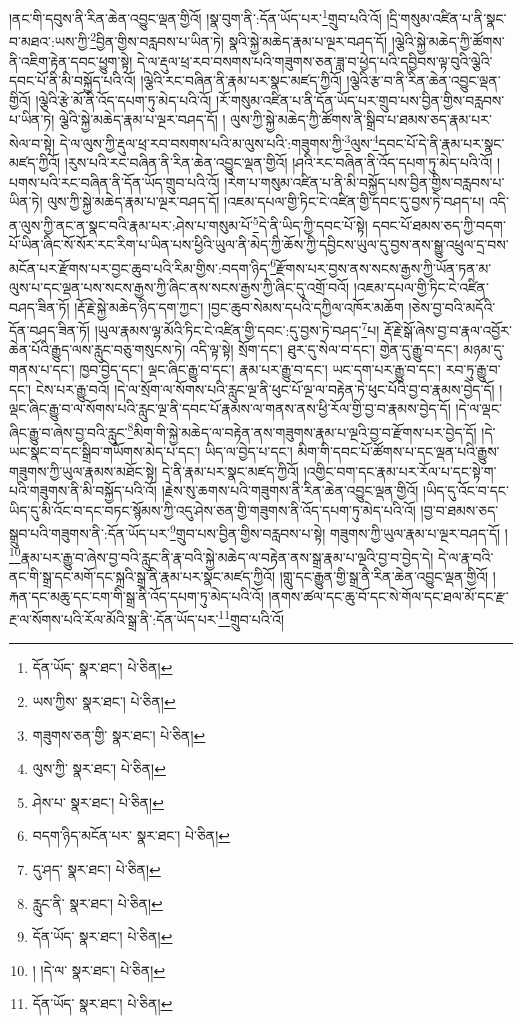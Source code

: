 །ནང་གི་དབུས་ནི་རིན་ཆེན་འབྱུང་ལྡན་གྱིའོ། །སྣ་བུག་ནི་:དོན་ཡོད་པར་\footnote{དོན་ཡོད་  སྣར་ཐང་།  པེ་ཅིན། }གྲུབ་པའི་འོ། །དྲི་གསུམ་འཛིན་པ་ནི་སྣང་བ་མཐའ་:ཡས་ཀྱི་\footnote{ཡས་ཀྱིས་  སྣར་ཐང་།  པེ་ཅིན། }བྱིན་གྱིས་བརླབས་པ་ཡིན་ཏེ། སྣའི་སྐྱེ་མཆེད་རྣམ་པ་ལྔར་བཤད་དོ། །ལྕེའི་སྐྱེ་མཆེད་ཀྱི་ཚོགས་ནི་འཇིག་རྟེན་དབང་ཕྱུག་སྟེ། དེ་ལ་རྡུལ་ཕྲ་རབ་བསགས་པའི་གཟུགས་ཅན་ཟླ་བ་ཕྱེད་པའི་དབྱིབས་ལྟ་བུའི་ལྕེའི་དབང་པོ་ནི་མི་བསྐྱོད་པའི་འོ། །ལྕེའི་རང་བཞིན་ནི་རྣམ་པར་སྣང་མཛད་ཀྱིའོ། །ལྕེའི་རྩ་བ་ནི་རིན་ཆེན་འབྱུང་ལྡན་གྱིའོ། །ལྕེའི་རྩེ་མོ་ནི་འོད་དཔག་ཏུ་མེད་པའི་འོ། །རོ་གསུམ་འཛིན་པ་ནི་དོན་ཡོད་པར་གྲུབ་པས་བྱིན་གྱིས་བརླབས་པ་ཡིན་ཏེ། ལྕེའི་སྐྱེ་མཆེད་རྣམ་པ་ལྔར་བཤད་དོ། །
ལུས་ཀྱི་སྐྱེ་མཆེད་ཀྱི་ཚོགས་ནི་སྒྲིབ་པ་ཐམས་ཅད་རྣམ་པར་སེལ་བ་སྟེ། དེ་ལ་ལུས་ཀྱི་རྡུལ་ཕྲ་རབ་བསགས་པའི་མ་ལུས་པའི་:གཟུགས་ཀྱི་\footnote{གཟུགས་ཅན་གྱི་  སྣར་ཐང་།  པེ་ཅིན། }ལུས་\footnote{ལུས་ཀྱི་  སྣར་ཐང་།  པེ་ཅིན། }དབང་པོ་དེ་ནི་རྣམ་པར་སྣང་མཛད་ཀྱིའོ། །རུས་པའི་རང་བཞིན་ནི་རིན་ཆེན་འབྱུང་ལྡན་གྱིའོ། །ཤའི་རང་བཞིན་ནི་འོད་དཔག་ཏུ་མེད་པའི་འོ། །པགས་པའི་རང་བཞིན་ནི་དོན་ཡོད་གྲུབ་པའི་འོ། །རེག་པ་གསུམ་འཛིན་པ་ནི་མི་བསྐྱོད་པས་བྱིན་གྱིས་བརླབས་པ་ཡིན་ཏེ། ལུས་ཀྱི་སྐྱེ་མཆེད་རྣམ་པ་ལྔར་བཤད་དོ། །འཇམ་དཔལ་གྱི་ཏིང་ངེ་འཛིན་གྱི་དབང་དུ་བྱས་ཏེ་བཤད་པ། འདི་ན་ལུས་ཀྱི་ནང་ན་སྣང་བའི་རྣམ་པར་:ཤེས་པ་གསུམ་པོ་\footnote{ཤེས་པ་  སྣར་ཐང་།  པེ་ཅིན། }དེ་ནི་ཡིད་ཀྱི་དབང་པོ་སྟེ། དབང་པོ་ཐམས་ཅད་ཀྱི་བདག་པོ་ཡིན་ཞིང་སོ་སོར་རང་རིག་པ་ཡིན་པས་ཕྱིའི་ཡུལ་ནི་མེད་ཀྱི་ཆོས་ཀྱི་དབྱིངས་ཡུལ་དུ་བྱས་ནས་སྒྱུ་འཕྲུལ་དྲ་བས་མངོན་པར་རྫོགས་པར་བྱང་ཆུབ་པའི་རིམ་གྱིས་:བདག་ཉིད་\footnote{བདག་ཉིད་མངོན་པར་  སྣར་ཐང་།  པེ་ཅིན། }རྫོགས་པར་བྱས་ནས་སངས་རྒྱས་ཀྱི་ཡོན་ཏན་མ་ལུས་པ་དང་ལྡན་པས་སངས་རྒྱས་ཀྱི་ཞིང་ནས་སངས་རྒྱས་ཀྱི་ཞིང་དུ་འགྲོ་བའོ། །འཇམ་དཔལ་གྱི་ཏིང་ངེ་འཛིན་བཤད་ཟིན་ཏོ། །རྡོ་རྗེ་སྐྱེ་མཆེད་ཉིད་དག་ཀྱང་། །བྱང་ཆུབ་སེམས་དཔའི་དཀྱིལ་འཁོར་མཆོག །ཅེས་བྱ་བའི་མདོའི་དོན་བཤད་ཟིན་ཏོ། །ཡུལ་རྣམས་ལྷ་མོའི་ཏིང་ངེ་འཛིན་གྱི་དབང་:དུ་བྱས་ཏེ་བཤད་\footnote{དུ་ཤད་  སྣར་ཐང་།  པེ་ཅིན། }པ། རྡོ་རྗེ་སྒོ་ཞེས་བྱ་བ་རྣལ་འབྱོར་ཆེན་པོའི་རྒྱུད་ལས་རླུང་བཅུ་གསུངས་ཏེ། འདི་ལྟ་སྟེ། སྲོག་དང་། ཐུར་དུ་སེལ་བ་དང་། གྱེན་དུ་རྒྱུ་བ་དང་། མཉམ་དུ་གནས་པ་དང་། ཁྱབ་བྱེད་དང་། ལྡང་ཞིང་རྒྱུ་བ་དང་། རྣམ་པར་རྒྱུ་བ་དང་། ཡང་དག་པར་རྒྱུ་བ་དང་། རབ་ཏུ་རྒྱུ་བ་དང་། ངེས་པར་རྒྱུ་བའོ། །དེ་ལ་སྲོག་ལ་སོགས་པའི་རླུང་ལྔ་ནི་ཕུང་པོ་ལྔ་ལ་བརྟེན་ཏེ་ཕུང་པོའི་བྱ་བ་རྣམས་བྱེད་དོ། །ལྡང་ཞིང་རྒྱུ་བ་ལ་སོགས་པའི་རླུང་ལྔ་ནི་དབང་པོ་རྣམས་ལ་གནས་ནས་ཕྱི་རོལ་གྱི་བྱ་བ་རྣམས་བྱེད་དོ། །དེ་ལ་ལྡང་ཞིང་རྒྱུ་བ་ཞེས་བྱ་བའི་རླུང་\footnote{རླུང་ནི་  སྣར་ཐང་།  པེ་ཅིན། }མིག་གི་སྐྱེ་མཆེད་ལ་བརྟེན་ནས་གཟུགས་རྣམ་པ་ལྔའི་བྱ་བ་རྫོགས་པར་བྱེད་དོ། །དེ་ཡང་སྣང་བ་དང་སྒྲིབ་གཡོགས་མེད་པ་དང་། ཡིད་ལ་བྱེད་པ་དང་། མིག་གི་དབང་པོ་ཚོགས་པ་དང་ལྡན་པའི་རྒྱུས་གཟུགས་ཀྱི་ཡུལ་རྣམས་མཐོང་སྟེ། དེ་ནི་རྣམ་པར་སྣང་མཛད་ཀྱིའོ། །འགྱིང་བག་དང་རྣམ་པར་རོལ་པ་དང་སྟེ་ག་པའི་གཟུགས་ནི་མི་བསྐྱོད་པའི་འོ། །རྗེས་སུ་ཆགས་པའི་གཟུགས་ནི་རིན་ཆེན་འབྱུང་ལྡན་གྱིའོ། །ཡིད་དུ་འོང་བ་དང་ཡིད་དུ་མི་འོང་བ་དང་བཏང་སྙོམས་ཀྱི་འདུ་ཤེས་ཅན་གྱི་གཟུགས་ནི་འོད་དཔག་ཏུ་མེད་པའི་འོ། །བྱ་བ་ཐམས་ཅད་སྒྲུབ་པའི་གཟུགས་ནི་:དོན་ཡོད་པར་\footnote{དོན་ཡོད་  སྣར་ཐང་།  པེ་ཅིན། }གྲུབ་པས་བྱིན་གྱིས་བརླབས་པ་སྟེ། གཟུགས་ཀྱི་ཡུལ་རྣམ་པ་ལྔར་བཤད་དོ། །\footnote{། །དེ་ལ་  སྣར་ཐང་།  པེ་ཅིན། }རྣམ་པར་རྒྱུ་བ་ཞེས་བྱ་བའི་རླུང་ནི་རྣ་བའི་སྐྱེ་མཆེད་ལ་བརྟེན་ནས་སྒྲ་རྣམ་པ་ལྔའི་བྱ་བ་བྱེད་དེ། དེ་ལ་རྣ་བའི་ནང་གི་སྒྲ་དང་མགོ་དང་སྐྲའི་སྒྲ་ནི་རྣམ་པར་སྣང་མཛད་ཀྱིའོ། །གླུ་དང་རྒྱུན་གྱི་སྒྲ་ནི་རིན་ཆེན་འབྱུང་ལྡན་གྱིའོ། །རྐན་དང་མཆུ་དང་ངག་གི་སྒྲ་ནི་འོད་དཔག་ཏུ་མེད་པའི་འོ། །ནགས་ཚལ་དང་ཆུ་བོ་དང་སེ་གོལ་དང་ཐལ་མོ་དང་རྫ་རྔ་ལ་སོགས་པའི་རོལ་མོའི་སྒྲ་ནི་:དོན་ཡོད་པར་\footnote{དོན་ཡོད་  སྣར་ཐང་།  པེ་ཅིན། }གྲུབ་པའི་འོ། 